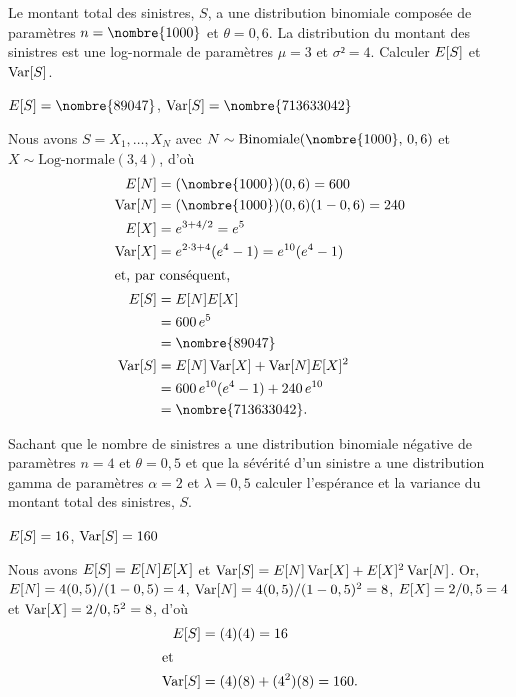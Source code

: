 \begin{exercice}
  Le montant total des sinistres, $S$, a une distribution binomiale
  composée de paramètres $n = \nombre{1000}$ et $\theta = 0,6$. La
  distribution du montant des sinistres est une log-normale de
  paramètres $\mu = 3$ et $\sigma² = 4$. Calculer $E [ S ]$ et
  $\operatorname{Var} [ S ]$.
  \begin{rep}
    $\esp{S} = \nombre{89047}$, $\var{S} = \nombre{713633042}$
  \end{rep}
  \begin{sol}
    Nous avons $S = X_1, \dots, X_N$ avec
    $N \sim \text{Binomiale}(\nombre{1000},\, 0,6)$ et
    $X \sim \text{Log-normale}(3, 4)$, d'où
    \begin{align*}
      \esp{N} &= (\nombre{1000})(0,6) = 600 \\
      \var{N} &= (\nombre{1000})(0,6)(1 - 0,6) = 240 \\
      \esp{X} &= e^{3 + 4/2} = e^5 \\
      \var{X} &= e^{2 \cdot 3 + 4}(e^4 - 1) = e^{10}(e^4 - 1) \\
      \intertext{et, par conséquent,}
      \esp{S}
      &= \esp{N} \esp{X} \\
      &= 600\, e^5 \\
      &= \nombre{89047} \\
      \var{S}
      &= \esp{N} \var{X} + \var{N} \esp{X}^2 \\
      &= 600\, e^{10}(e^4 - 1) + 240\, e^{10} \\
      &= \nombre{713633042}.
    \end{align*}
  \end{sol}
\end{exercice}

\begin{exercice}
  Sachant que le nombre de sinistres a une distribution binomiale
  négative de paramètres $n = 4$ et $\theta = 0,5$ et que la sévérité
  d'un sinistre a une distribution gamma de paramètres $\alpha = 2$ et
  $\lambda = 0,5$ calculer l'espérance et la variance du montant total
  des sinistres, $S$.
  \begin{rep}
    $E [ S ] = 16$, $\operatorname{Var} [ S ] = 160$
  \end{rep}
  \begin{sol}
    Nous avons $E [ S ] = E [ N ]E [ X ]$ et $\operatorname{Var} [ S ] = E [ N ]\operatorname{Var} [ X ] +
    E [ X ]^2\operatorname{Var} [ N ]$. Or, $E [ N ] = 4 (0,5)/(1 - 0,5) = 4$, $\operatorname{Var} [ N ]
    = 4 (0,5)/(1 - 0,5)^2 = 8$, $E [ X ] = 2/0,5 = 4$ et $\operatorname{Var} [ X ] =
    2/0,5^2 = 8$, d'où
    \begin{align*}
        E [ S ]
        &= (4)(4)
         = 16 \\
        \intertext{et}
        \operatorname{Var} [ S ]
        &= (4)(8) + (4^2)(8)
         = 160.
    \end{align*}
  \end{sol}
\end{exercice}

